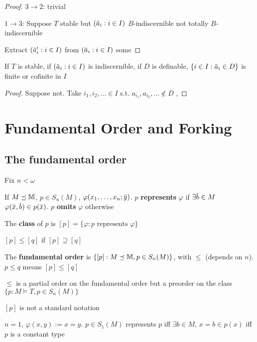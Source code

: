 \documentclass[11pt]{article}
\begin{document}
\begin{proof}
\(3\to 2\): trivial

\(1\to 3\): Suppose \(T\) stable but \((\bara_i:i\in I)\) \(B\)-indiscernible not
totally \(B\)-indiscernible

Extract \((\bara_i':i\in I)\) from \((\bara_i:i\in I)\) some
\end{proof}

\begin{corollary}[]
If \(T\) is stable, if \((\bara_i:i\in I)\) is indiscernible, if \(D\) is
definable, \(\{i\in I:\bara_i\in D\}\) is finite or cofinite in \(I\)
\end{corollary}

\begin{proof}
Suppose not. Take \(i_1,i_2,\dots\in I\) s.t. \(a_{i_1},a_{i_2},\dots\notin D\) , 
\end{proof}


\section{Fundamental Order and Forking}
\label{sec:org5674728}
\subsection{The fundamental order}
\label{sec:org4126a7f}
Fix \(n<\omega\)
\begin{definition}[]
If \(M\preceq\mathbb{M}\), \(p\in S_n(M)\), \(\varphi(x_1,\dots,x_n;\bary)\). \(p\) \textbf{represents} \(\varphi\)
if \(\exists\barb\in M\) \(\varphi(\barx,\barb)\in p(\barx)\). \(p\) \textbf{omits} \(\varphi\) otherwise

The \textbf{class} of \(p\) is \([p]=\{\varphi:p\text{ represents }\varphi\}\)

\([p]\le[q]\) if \([p]\supseteq[q]\)

The \textbf{fundamental order} is \(\{[p]:M\preceq\mathbb{M},p\in S_n(M)\}\), with \(\le\) (depends on \(n\)). \(p\le q\) means \([p]\le[q]\)
\end{definition}

\begin{remark}
\(\le\) is a partial order on the fundamental order but a preorder on the class \(\{p:M\vDash T,p\in S_n(M)\}\)
\end{remark}

\([p]\) is not a standard notation

\begin{examplle}[]
\(n=1\), \(\varphi(x,y):=x=y\). \(p\in S_1(M)\) represents \(p\) iff \(\exists b\in M\), \(x=b\in p(x)\) iff \(p\)
is a constant type
\end{examplle}
\end{document}
